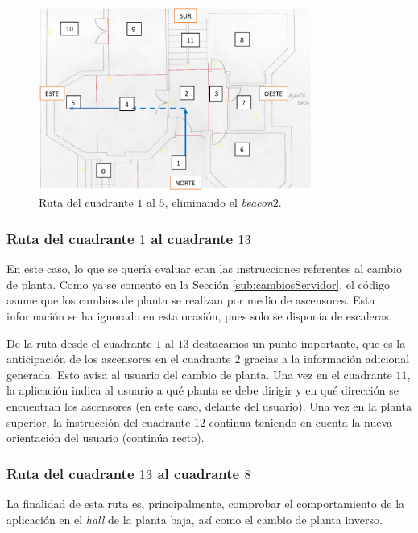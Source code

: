 \begin{figure}[t]
	\centering
	\includegraphics[width=0.8\textwidth]{Imagenes/Evaluacion/del1al5sin2}
	\caption{Ruta del cuadrante $1$ al $5$, eliminando el \textit{beacon$2$}.}
	\label{fig:del1al5sin2}
\end{figure}

\subsubsection{Ruta del cuadrante $1$ al cuadrante $13$}

En este caso, lo que se quería evaluar eran las instrucciones referentes al cambio de planta. Como ya se comentó en la Sección \ref{sub:cambiosServidor}, el código asume que los cambios de planta se realizan por medio de ascensores. Esta información se ha ignorado en esta ocasión, pues solo se disponía de escaleras. 

De la ruta desde el cuadrante $1$ al $13$ destacamos un punto importante, que es la anticipación de los ascensores en el cuadrante $2$ gracias a la información adicional generada. Esto avisa al usuario del cambio de planta. Una vez en el cuadrante $11$, la aplicación indica al usuario a qué planta se debe dirigir y en qué dirección se encuentran los ascensores (en este caso, delante del usuario). Una vez en la planta superior, la instrucción del cuadrante 12 continua teniendo en cuenta la nueva orientación del usuario (continúa recto). 

\subsubsection{Ruta del cuadrante $13$ al cuadrante $8$}
\label{subsub:13al8}

La finalidad de esta ruta es, principalmente, comprobar el comportamiento de la aplicación en el \textit{hall} de la planta baja, así como el cambio de planta inverso. 

